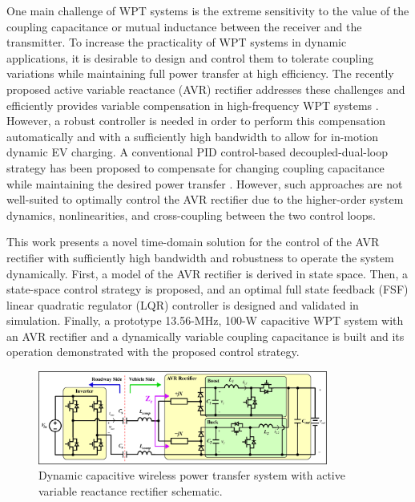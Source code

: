 \documentclass[journal, onecolumn, final, letterpaper, 11pt]{IEEEtran}
\begin{document}
One main challenge of WPT systems is the extreme sensitivity to the value of the coupling capacitance or mutual inductance between the receiver and the transmitter. To increase the practicality of WPT systems in dynamic applications, it is desirable to design and control them to tolerate coupling variations while maintaining full power transfer at high efficiency. The recently proposed active variable reactance (AVR) rectifier addresses these challenges and efficiently provides variable compensation in high-frequency WPT systems \cite{2019_Sinha_Journal}. However, a robust controller is needed in order to perform this compensation automatically and with a sufficiently high bandwidth to allow for in-motion dynamic EV charging. A conventional PID control-based decoupled-dual-loop strategy has been proposed to compensate for changing coupling capacitance while maintaining the desired power transfer \cite{2019_Sinha_ECCE, 2024_Maji_COMPEL}. However, such approaches are not well-suited to optimally control the AVR rectifier due to the higher-order system dynamics, nonlinearities, and cross-coupling between the two control loops.

This work presents a novel time-domain solution for the control of the AVR rectifier with sufficiently high bandwidth and robustness to operate the system dynamically. First, a model of the AVR rectifier is derived in state space. Then, a state-space control strategy is proposed, and an optimal full state feedback (FSF) linear quadratic regulator (LQR) controller is designed and validated in simulation. Finally, a prototype 13.56-MHz, 100-W capacitive WPT system with an AVR rectifier and a dynamically variable coupling capacitance is built and its operation demonstrated with the proposed control strategy.

\begin{figure}[!ht]
	\vspace{-0.7cm}
	\centering
	\includegraphics[width=0.85\textwidth]{figures/wpt_with_avr_full_schematic_eps.eps}
	\caption{Dynamic capacitive wireless power transfer system with active variable reactance rectifier schematic.}
	\label{fig:full_schematic}
	
	\vspace{-0.5cm}
\end{figure}
\end{document}
